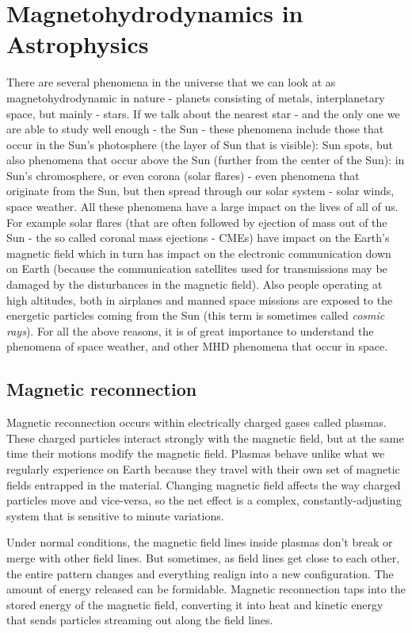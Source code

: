 \section{Magnetohydrodynamics in Astrophysics}
There are several phenomena in the universe that we can look at as magnetohydrodynamic in nature - planets consisting of metals, interplanetary space, but mainly - stars. If we talk about the nearest star - and the only one we are able to study well enough - the Sun - these phenomena include those that occur in the Sun's photosphere (the layer of Sun that is visible): Sun spots, but also phenomena that occur above the Sun (further from the center of the Sun): in Sun's chromosphere, or even corona (solar flares) - even phenomena that originate from the Sun, but then spread through our solar system - solar winds, space weather. All these phenomena have a large impact on the lives of all of us. For example solar flares (that are often followed by ejection of mass out of the Sun - the so called coronal mass ejections - CMEs) have impact on the Earth's magnetic field which in turn has impact on the electronic communication down on Earth (because the communication satellites used for transmissions may be damaged by the disturbances in the magnetic field). Also people operating at high altitudes, both in airplanes and manned space missions are exposed to the energetic particles coming from the Sun (this term is sometimes called \textit{cosmic rays}). For all the above reasons, it is of great importance to understand the phenomena of space weather, and other MHD phenomena that occur in space.

\subsection{Magnetic reconnection}
Magnetic reconnection occurs within electrically charged gases called plasmas. These charged particles interact strongly with the magnetic field, but at the same time their motions modify the magnetic field. Plasmas behave unlike what we regularly experience on Earth because they travel with their own set of magnetic fields entrapped in the material. Changing magnetic field affects the way charged particles move and vice-versa, so the net effect is a complex, constantly-adjusting system that is sensitive to minute variations.

Under normal conditions, the magnetic field lines inside plasmas don't break or merge with other field lines. But sometimes, as field lines get close to each other, the entire pattern changes and everything realign into a new configuration. The amount of energy released can be formidable. Magnetic reconnection taps into the stored energy of the magnetic field, converting it into heat and kinetic energy that sends particles streaming out along the field lines.

